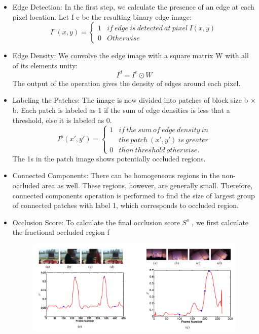 \documentclass{sig-alternate}
\begin{document}
 \begin{itemize} 
\item Edge Detection: In the first step, we calculate the presence of
an edge at each pixel location. Let I e be the resulting binary
edge image:
\[I^e(x,y) = \left\{\begin{matrix} 1 & if\ edge\ is\ detected\ at\ pixel\ I(x,y)\\ 0 & Otherwise \end{matrix}\right.\tag{1}\]
\item Edge Density: We convolve the edge image with a square
matrix W with all of its elements unity:
\[I^d = I^e\odot W\tag{2}\]
The output of the operation gives the density of edges around
each pixel.
\item Labeling the Patches: The image is now divided into patches
of block size b × b. Each patch is labeled as 1 if the sum of
edge densities is less that a threshold, else it is labeled as 0.
\[I^p(x',y') = \left\{\begin{matrix} 1 & if\ the\ sum\ of\ edge\ density\ in \\ & the\ patch\ (x',y')\ is\ greater\\ 0& than\ threshold\ otherwise. \end{matrix}\right.\tag{3}\]
The 1s in the patch image shows potentially occluded regions.
\item Connected Components: There can be homogeneous regions
in the non-occluded area as well. These regions, however, are
generally small. Therefore, connected components operation
is performed to find the size of largest group of connected
patches with label 1, which corresponds to occluded region.
\item Occlusion Score: To calculate the final occlusion score $S^o$ ,
we first calculate the fractional occluded region f 
\begin{figure}
  \includegraphics[width=\textwidth]{three.pdf}
\end{figure}\\

\end{itemize}
\end{document}
